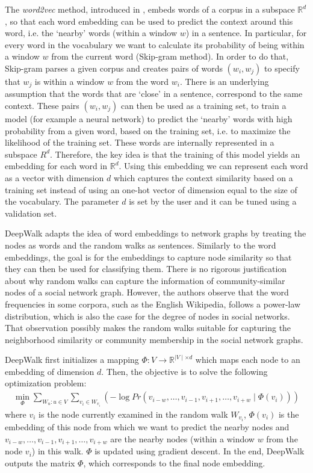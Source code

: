 The \emph{word2vec} method, introduced in \cite{mikolov2013efficient}, embeds
words of a corpus in a subspace $\mathbb{R}^d$, so that each word embedding can
be used to predict the context around this word, i.e. the `nearby' words (within
a window $w$) in a sentence. In particular, for every word in the vocabulary we
want to calculate its probability of being within a window $w$ from the current
word (Skip-gram method).
In order to do that, Skip-gram parses a given corpus and creates pairs of words
$(w_i, w_j)$ to specify that $w_j$ is within a window $w$ from the word $w_i$.
There is an underlying assumption that the words that are `close' in a
sentence, correspond to the same context. These pairs $(w_i, w_j)$ can then be
used as a training set, to train a model (for example a neural network) to
predict the `nearby' words with high probability from a given word, based on the
training set, i.e. to maximize the likelihood of the training set. These words
are internally represented in a subspace $R^d$. Therefore, the key idea is that
the training of this model yields an embedding for each word in $\mathbb{R}^d$.
Using this embedding we can represent each word as a vector with dimension $d$
which captures the context similarity based on a training set instead of using
an one-hot vector of dimension equal to the size of the vocabulary. The parameter
$d$ is set by the user and it can be tuned using a validation set.

DeepWalk adapts the idea of word embeddings to network graphs by treating the
nodes as words and the random walks as sentences. Similarly to the word
embeddings, the goal is for the embeddings to capture node similarity so that
they can then be used for classifying them. There is no rigorous justification
about why random walks can capture the information of community-similar nodes of
a social network graph. However, the authors observe that the word frequencies in
some corpora, such as the English Wikipedia, follows a power-law distribution,
which is also the case for the degree of nodes in social networks. That
observation possibly makes the random walks suitable for capturing the
neighborhood similarity or community membership in the social network graphs.

DeepWalk first initializes a mapping
$\Phi: V \to \mathbb{R}^{\mid V\mid \times d}$ which maps each node to an
embedding of dimension $d$. Then, the objective is to solve the following
optimization problem:
\begin{align}
    \min_{\Phi}
        \sum_{W_{u}: u \in V} \sum_{v_i \in W_{v_i}} \left (-\log{Pr({v_{i-w},
                \ldots, v_{i-1}, v_{i+1},
                \ldots , v_{i+w}} \mid \Phi(v_i))}
        \right )
\end{align}
where $v_i$ is the node currently examined in the random walk $W_{v_i}$,
$\Phi(v_i)$ is the embedding of this node from which we want to predict the
nearby nodes and $v_{i-w}, \ldots, v_{i-1}, v_{i+1}, \ldots, v_{i+w}$ are the
nearby nodes (within a window $w$ from the node $v_i$) in this walk.
$\Phi$ is updated using gradient descent. In the end, DeepWalk outputs the
matrix $\Phi$, which corresponds to the final node embedding.

